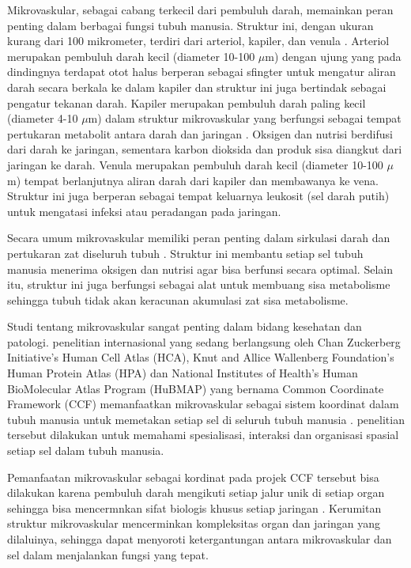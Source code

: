 \noindent Mikrovaskular, sebagai cabang terkecil dari pembuluh darah, memainkan peran penting dalam berbagai fungsi tubuh manusia. Struktur ini, dengan ukuran kurang dari 100 mikrometer, terdiri dari arteriol, kapiler, dan venula \cite{mescher_junqueiras_2021,pepe_microvascular_2023}. Arteriol merupakan pembuluh darah kecil (diameter 10-100 $\mu$m) dengan ujung yang pada dindingnya terdapat otot halus berperan sebagai sfingter untuk mengatur aliran darah secara berkala ke dalam kapiler dan struktur ini juga bertindak sebagai pengatur tekanan darah. Kapiler merupakan pembuluh darah paling kecil (diameter 4-10 $\mu$m) dalam struktur mikrovaskular yang berfungsi sebagai tempat pertukaran metabolit antara darah dan jaringan \cite{haffner_emerging_2023}. Oksigen dan nutrisi berdifusi dari darah ke jaringan, sementara karbon dioksida dan produk sisa diangkut dari jaringan ke darah. Venula merupakan pembuluh darah kecil (diameter 10-100 $\mu$m) tempat berlanjutnya aliran darah dari kapiler dan membawanya ke vena. Struktur ini juga berperan sebagai tempat keluarnya leukosit (sel darah putih) untuk mengatasi infeksi atau peradangan pada jaringan.

\noindent Secara umum mikrovaskular memiliki peran penting dalam sirkulasi darah dan pertukaran zat diseluruh tubuh \cite{rusanova_role_2022}. Struktur ini membantu setiap sel tubuh manusia menerima oksigen dan nutrisi agar bisa berfunsi secara optimal. Selain itu, struktur ini juga berfungsi sebagai alat untuk membuang sisa metabolisme sehingga tubuh tidak akan keracunan akumulasi zat sisa metabolisme.

\noindent Studi tentang mikrovaskular sangat penting dalam bidang kesehatan dan patologi. penelitian internasional yang sedang berlangsung oleh Chan Zuckerberg Initiative's Human Cell Atlas (HCA), Knut and Allice Wallenberg Foundation's Human Protein Atlas (HPA) dan National Institutes of Health's Human BioMolecular Atlas Program (HuBMAP) yang bernama Common Coordinate Framework (CCF) memanfaatkan mikrovaskular sebagai sistem koordinat dalam tubuh manusia untuk memetakan setiap sel di seluruh tubuh manusia \cite{weber_considerations_2020}. penelitian tersebut dilakukan untuk memahami spesialisasi, interaksi dan organisasi spasial setiap sel dalam tubuh manusia.

\noindent Pemanfaatan mikrovaskular sebagai kordinat pada projek CCF tersebut bisa dilakukan karena pembuluh darah  mengikuti setiap jalur unik di setiap organ sehingga bisa mencermnkan sifat biologis khusus setiap jaringan \cite{weber_considerations_2020}. Kerumitan struktur mikrovaskular mencerminkan kompleksitas organ dan jaringan yang dilaluinya, sehingga dapat menyoroti ketergantungan antara mikrovaskular dan sel dalam menjalankan fungsi yang tepat. 



